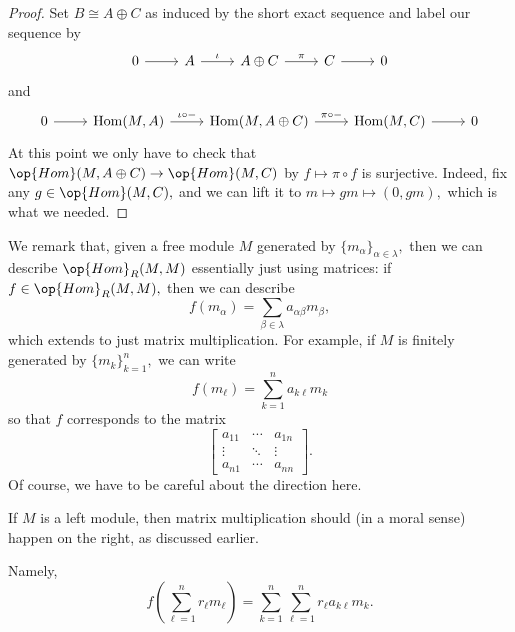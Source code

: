 \documentclass[../notes.tex]{subfiles}
\begin{document}
\begin{proof}
	Set $B\cong A\oplus C$ as induced by the short exact sequence and label our sequence by
	\[\begin{tikzcd}
		0 & A & {A\oplus C} & C & 0
		\arrow[from=1-1, to=1-2]
		\arrow["\iota", from=1-2, to=1-3]
		\arrow["\pi", from=1-3, to=1-4]
		\arrow[from=1-4, to=1-5]
	\end{tikzcd}\]
	and
	\[\begin{tikzcd}
		0 & {\operatorname{Hom}(M,A)} & {\operatorname{Hom}(M,A\oplus C)} & {\operatorname{Hom}(M,C)} & 0
		\arrow[from=1-1, to=1-2]
		\arrow["{\iota\circ-}", from=1-2, to=1-3]
		\arrow["{\pi\circ-}", from=1-3, to=1-4]
		\arrow[from=1-4, to=1-5]
	\end{tikzcd}\]
	At this point we only have to check that $\op{Hom}(M,A\oplus C)\to\op{Hom}(M,C)$ by $f\mapsto\pi\circ f$ is surjective. Indeed, fix any $g\in\op{Hom}(M,C),$ and we can lift it to $m\mapsto gm\mapsto(0,gm),$ which is what we needed.
\end{proof}
We remark that, given a free module $M$ generated by $\{m_\alpha\}_{\alpha\in\lambda},$ then we can describe $\op{Hom}_R(M,M)$ essentially just using matrices: if $f\in\op{Hom}_R(M,M),$ then we can describe
\[f(m_\alpha)=\sum_{\beta\in\lambda}a_{\alpha\beta}m_\beta,\]
which extends to just matrix multiplication. For example, if $M$ is finitely generated by $\{m_k\}_{k=1}^n,$ we can write
\[f(m_\ell)=\sum_{k=1}^na_{k\ell}m_k\]
so that $f$ corresponds to the matrix
\[\begin{bmatrix}
	a_{11} & \cdots & a_{1n} \\
	\vdots & \ddots & \vdots \\
	a_{n1} & \cdots & a_{nn}
\end{bmatrix}.\]
Of course, we have to be careful about the direction here.
\begin{warn}
	If $M$ is a left module, then matrix multiplication should (in a moral sense) happen on the right, as discussed earlier.
\end{warn}
Namely,
\[f\left(\sum_{\ell=1}^nr_\ell m_\ell\right)=\sum_{k=1}^n\sum_{\ell=1}^nr_\ell a_{k\ell}m_k.\]
\end{document}
